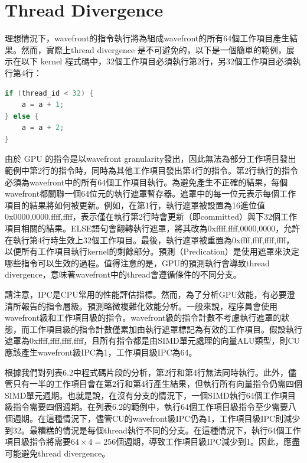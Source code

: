  \section{Thread Divergence}
 理想情況下，wavefront的指令執行將為組成wavefront的所有64個工作項目產生結果。然而，實際上thread divergence 是不可避免的，以下是一個簡單的範例，展示在以下 kernel 程式碼中，32個工作項目必須執行第2行，另32個工作項目必須執行第4行：
\lstset{style=mystyle}
\begin{lstlisting}[language=c++,caption={diverging範例程式碼。}]
if (thread_id < 32) {
    a = a + 1;
} else {
    a = a + 2;
}
\end{lstlisting}

\vspace{1em}
由於 GPU 的指令是以wavefront granularity發出，因此無法為部分工作項目發出範例中第2行的指令時，同時為其他工作項目發出第4行的指令。第2行執行的指令必須為wavefront中的所有64個工作項目執行。為避免產生不正確的結果，每個wavefront都關聯一個64位元的執行遮罩暫存器。遮罩中的每一位元表示每個工作項目的結果將如何被更新。例如，在第1行，執行遮罩被設置為16進位值0x0000,0000,ffff,ffff，表示僅在執行第2行時會更新（即committed）與下32個工作項目相關的結果。ELSE語句會翻轉執行遮罩，將其改為0xffff,ffff,0000,0000，允許在執行第4行時生效上32個工作項目。最後，執行遮罩被重置為0xffff,ffff,ffff,ffff，以便所有工作項目執行kernel的剩餘部分。預測（Predication）是使用遮罩來決定哪些指令可以生效的過程。值得注意的是，GPU的預測執行會導致thread divergence，意味著wavefront中的thread會遵循條件的不同分支。

\vspace{1em}
請注意，IPC是CPU常用的性能評估指標。然而，為了分析GPU效能，有必要澄清所報告的指令層級。預測略微複雜化效能分析。一般來說，程序員會使用wavefront級和工作項目級的指令。wavefront級的指令計數不考慮執行遮罩的狀態，而工作項目級的指令計數僅累加由執行遮罩標記為有效的工作項目。假設執行遮罩為0xffff,ffff,ffff,ffff，且所有指令都是由SIMD單元處理的向量ALU類型，則CU應該產生wavefront級IPC為1，工作項目級IPC為64。

\vspace{1em}
根據我們對列表6.2中程式碼片段的分析，第2行和第4行無法同時執行。此外，儘管只有一半的工作項目會在第2行和第4行產生結果，但執行所有向量指令仍需四個SIMD單元週期。也就是說，在沒有分支的情況下，一個SIMD執行64個工作項目級指令需要四個週期。在列表6.2的範例中，執行64個工作項目級指令至少需要八個週期。在這種情況下，儘管CU的wavefront級IPC仍為1，工作項目級IPC則減少到32。最糟糕的情況是每個thread執行不同的分支。在這種情況下，執行64個工作項目級指令將需要$64 \times 4 = 256$個週期，導致工作項目級IPC減少到1。因此，應盡可能避免thread divergence。

